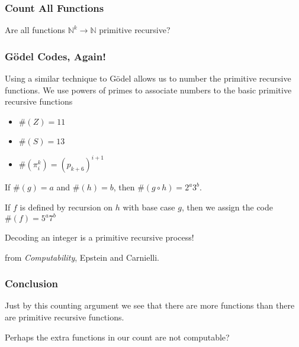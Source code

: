 \documentclass{beamer}
\theoremstyle{indentDefn} \newtheorem{defn}[]{Definition}
\begin{document}
\begin{frame}
	\frametitle{Count All Functions}

	Are all functions $\mathbb{N}^{k} \rightarrow \mathbb{N}$ primitive recursive? 
	\vspace{7cm}

\end{frame}

\begin{frame}
	\frametitle{G\"{o}del Codes, Again!}

	Using a similar technique to G\"{o}del allows us to number the primitive recursive functions. We use powers of primes to associate numbers to the basic primitive recursive functions 

	\begin{itemize}
		\item $\#(Z) = 11$ 
		\item $\#(S) = 13$
		\item $\#(\pi_{i}^{k}) = (p_{k+6})^{i+1}$
	\end{itemize}

	\vspace{0.5cm}

	If $\#(g) = a$ and $\#(h) = b$, then $\#(g\circ h) = 2^{a}3^{b}$.

	\vspace{0.5cm}

	If $f$ is defined by recursion on $h$ with base case $g$, then we assign the code $\#(f) = 5^{a}7^{b}$

	\vspace{0.5cm}

	Decoding an integer is a primitive recursive process!

	\vspace{1cm}

	from \emph{Computability}, Epstein and Carnielli.

\end{frame}

\begin{frame}
	\frametitle{Conclusion}

	Just by this counting argument we see that there are more functions than there are primitive recursive functions. 

	\vspace{0.5cm}

	Perhaps the extra functions in our count are not computable? 

	\vspace{5cm}

\end{frame}
\end{document}
